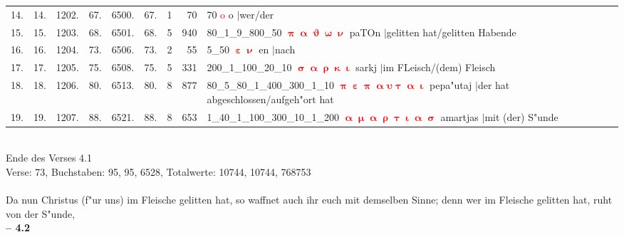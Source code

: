 \documentclass[a4paper,10pt,landscape]{article}
\begin{document}
\begin{tabular}{rrrrrrrrp{120mm}}
14.&14.&1202.&67.&6500.&67.&1&70&70 \textcolor{red}{$\boldsymbol{\mathrm{o}}$} o $|$wer/der\\
15.&15.&1203.&68.&6501.&68.&5&940&80\_1\_9\_800\_50 \textcolor{red}{$\boldsymbol{\uppi\upalpha\upvartheta\upomega\upnu}$} paTOn $|$gelitten hat/gelitten Habende\\
16.&16.&1204.&73.&6506.&73.&2&55&5\_50 \textcolor{red}{$\boldsymbol{\upepsilon\upnu}$} en $|$nach\\
17.&17.&1205.&75.&6508.&75.&5&331&200\_1\_100\_20\_10 \textcolor{red}{$\boldsymbol{\upsigma\upalpha\uprho\upkappa\upiota}$} sarkj $|$im FLeisch/(dem) Fleisch\\
18.&18.&1206.&80.&6513.&80.&8&877&80\_5\_80\_1\_400\_300\_1\_10 \textcolor{red}{$\boldsymbol{\uppi\upepsilon\uppi\upalpha\upsilon\uptau\upalpha\upiota}$} pepa"utaj $|$der hat abgeschlossen/aufgeh"ort hat\\
19.&19.&1207.&88.&6521.&88.&8&653&1\_40\_1\_100\_300\_10\_1\_200 \textcolor{red}{$\boldsymbol{\upalpha\upmu\upalpha\uprho\uptau\upiota\upalpha\upsigma}$} amartjas $|$mit (der) S"unde\\
\end{tabular}\medskip \\
Ende des Verses 4.1\\
Verse: 73, Buchstaben: 95, 95, 6528, Totalwerte: 10744, 10744, 768753\\
\\
Da nun Christus (f"ur uns) im Fleische gelitten hat, so waffnet auch ihr euch mit demselben Sinne; denn wer im Fleische gelitten hat, ruht von der S"unde,\\
\newpage 
{\bf -- 4.2}\\
\medskip \\
\end{document}

